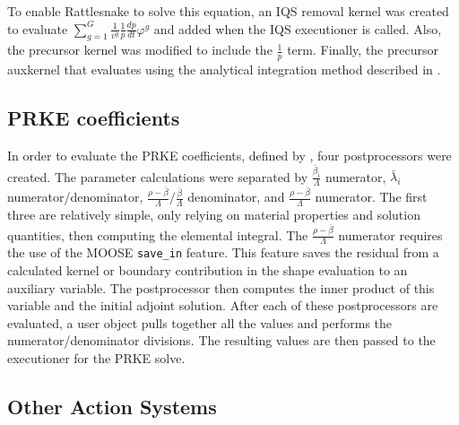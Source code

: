 To enable Rattlesnake to solve this equation, an IQS removal kernel was created to evaluate $\sum_{g=1}^G\frac{1}{v^g}\frac{1}{p}\frac{dp}{dt}\varphi^g$ and added when the IQS executioner is called.  Also, the precursor kernel was modified to include the $\frac{1}{p}$ term. Finally, the precursor auxkernel that evaluates  using the analytical integration method described in .

\subsection{PRKE coefficients}

In order to evaluate the PRKE coefficients, defined by , four postprocessors were created.  The parameter calculations were separated by $\frac{\bar{\beta}_i}{\Lambda}$ numerator, $\bar{\lambda}_i$ numerator/denominator, $\frac{\rho-\bar{\beta}}{\Lambda}/\frac{\bar{\beta}}{\Lambda}$ denominator, and $\frac{\rho-\bar{\beta}}{\Lambda}$ numerator. The first three are relatively simple, only relying on material properties and solution quantities, then computing the elemental integral.  The $\frac{\rho-\bar{\beta}}{\Lambda}$ numerator requires the use of the MOOSE \texttt{save\_in} feature. This feature saves the residual from a calculated kernel or boundary contribution in the shape evaluation to an auxiliary variable.  The postprocessor then computes the inner product of this variable and the initial adjoint solution.  After each of these postprocessors are evaluated, a user object pulls together all the values and performs the numerator/denominator divisions.  The resulting values are then passed to the executioner for the PRKE solve.

\subsection{Other Action Systems}

